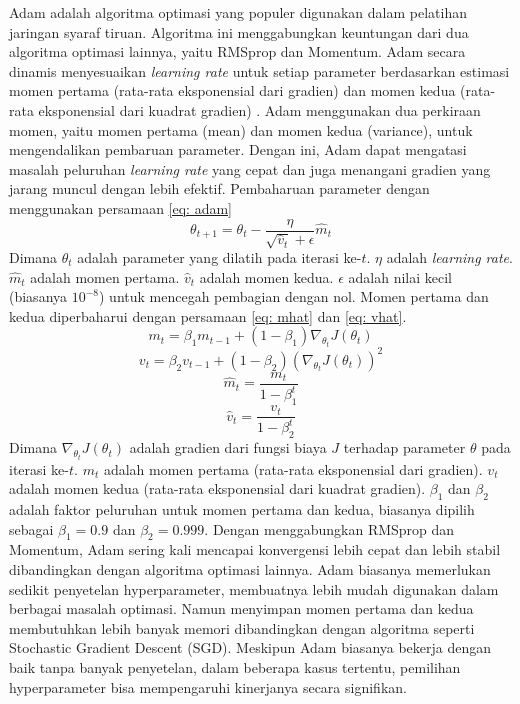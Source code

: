 \begin{enumerate}
    Adam adalah algoritma optimasi yang populer digunakan dalam pelatihan jaringan syaraf tiruan. Algoritma ini menggabungkan keuntungan dari dua algoritma optimasi lainnya, yaitu RMSprop dan Momentum. Adam secara dinamis menyesuaikan \textit{learning rate} untuk setiap parameter berdasarkan estimasi momen pertama (rata-rata eksponensial dari gradien) dan momen kedua (rata-rata eksponensial dari kuadrat gradien) \cite{GoodBengCour16}. Adam menggunakan dua perkiraan momen, yaitu momen pertama (mean) dan momen kedua (variance), untuk mengendalikan pembaruan parameter. Dengan ini, Adam dapat mengatasi masalah peluruhan \textit{learning rate} yang cepat dan juga menangani gradien yang jarang muncul dengan lebih efektif. Pembaharuan parameter dengan menggunakan persamaan \ref{eq: adam}
    \begin{equation}
        \theta_{t+1} = \theta_t - \frac{\eta}{\sqrt{\hat{v}_t} + \epsilon} \hat{m}_t
        \label{eq: adam}
    \end{equation}
    Dimana \(\theta_t\) adalah parameter yang dilatih pada iterasi ke-\(t\). \(\eta\) adalah \textit{learning rate}. \(\hat{m}_t\) adalah momen pertama. \(\hat{v}_t\) adalah momen kedua. \(\epsilon\) adalah nilai kecil (biasanya \(10^{-8}\)) untuk mencegah pembagian dengan nol. Momen pertama dan kedua diperbaharui dengan persamaan \ref{eq: mhat} dan \ref{eq: vhat}.
    \begin{equation}
        m_t = \beta_1 m_{t-1} + (1 - \beta_1) \nabla_{\theta_t} J(\theta_t)
    \end{equation}
    \begin{equation}
        v_t = \beta_2 v_{t-1} + (1 - \beta_2) (\nabla_{\theta_t} J(\theta_t))^2
    \end{equation}
    \begin{equation}
        \hat{m}_t = \frac{m_t}{1 - \beta_1^t}
        \label{eq: mhat}
    \end{equation}
    \begin{equation}
        \hat{v}_t = \frac{v_t}{1 - \beta_2^t}
        \label{eq: vhat}
    \end{equation}
    Dimana \(\nabla_{\theta_t} J(\theta_t)\) adalah gradien dari fungsi biaya \(J\) terhadap parameter \(\theta\) pada iterasi ke-\(t\). \(m_t\) adalah momen pertama (rata-rata eksponensial dari gradien). \(v_t\) adalah momen kedua (rata-rata eksponensial dari kuadrat gradien). \(\beta_1\) dan \(\beta_2\) adalah faktor peluruhan untuk momen pertama dan kedua, biasanya dipilih sebagai \(\beta_1 = 0.9\) dan \(\beta_2 = 0.999\). Dengan menggabungkan RMSprop dan Momentum, Adam sering kali mencapai konvergensi lebih cepat dan lebih stabil dibandingkan dengan algoritma optimasi lainnya. Adam biasanya memerlukan sedikit penyetelan hyperparameter, membuatnya lebih mudah digunakan dalam berbagai masalah optimasi. Namun menyimpan momen pertama dan kedua membutuhkan lebih banyak memori dibandingkan dengan algoritma seperti Stochastic Gradient Descent (SGD). Meskipun Adam biasanya bekerja dengan baik tanpa banyak penyetelan, dalam beberapa kasus tertentu, pemilihan hyperparameter bisa mempengaruhi kinerjanya secara signifikan.
    
    
\end{enumerate}

